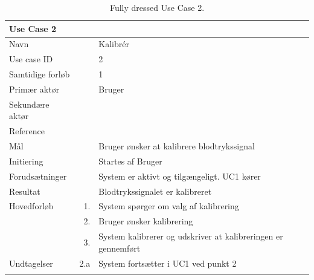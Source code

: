 \begin{longtabu} to  %
    {\large \textbf{Use Case 2}} && \\
    \toprule
    Navn &&    Kalibrér\\
    Use case ID &&    2\\
    Samtidige forløb &&    1\\
    Primær aktør &&    Bruger\\
    Sekundære aktør &&	 \\
    Reference &&      \\
    Mål &&    Bruger ønsker at kalibrere blodtrykssignal\\
    Initiering &&	Startes af Bruger\\
    Forudsætninger &&  System er aktivt og tilgængeligt. UC1 kører\\
    Resultat &&		Blodtrykssignalet er kalibreret                         \\ \midrule
    Hovedforløb &    1. &    System spørger om valg af kalibrering\\[-1ex]   				
    			&    2. &    Bruger ønsker kalibrering\\
                &    3.	&	 System kalibrerer og udskriver at kalibreringen er gennemført \newline\\ \midrule
                
    Undtagelser &    2.a &   System fortsætter i UC1 ved punkt 2  \\ \bottomrule
\caption{Fully dressed Use Case 2.}
\label{UC2}
\end{longtabu}


